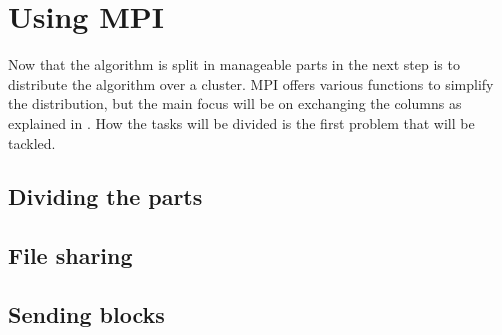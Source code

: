 \section{Using MPI}
Now that the algorithm is split in manageable parts in  the next step is to distribute the algorithm over a cluster.
MPI offers various functions to simplify the distribution, but the main focus will be on exchanging the columns as explained in .
How the tasks will be divided is the first problem that will be tackled.

\subsection{Dividing the parts}

\subsection{File sharing}

\subsection{Sending blocks}

